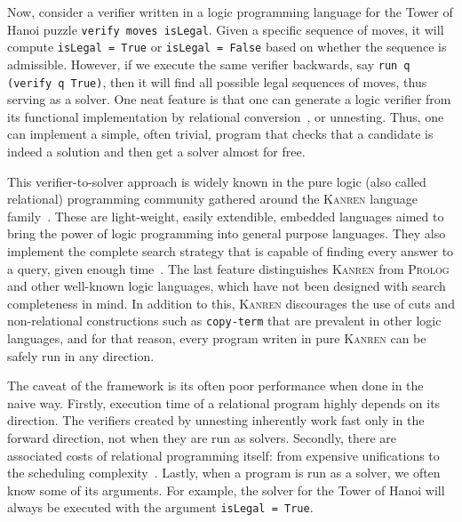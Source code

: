 Now, consider a verifier written in a logic programming language for the Tower of Hanoi puzzle \texttt{verify moves isLegal}. 
Given a specific sequence of moves, it will compute \texttt{isLegal = True} or \texttt{isLegal = False} based on whether the sequence is admissible. 
However, if we execute the same verifier backwards, say \texttt{run q (verify q True)}, then it will find all possible legal sequences of moves, thus serving as a solver. 
One neat feature is that one can generate a logic verifier from its functional implementation by relational conversion~\cite{lozov2018typed}, or unnesting. 
Thus, one can implement a simple, often trivial, program that checks that a candidate is indeed a solution and then get a solver almost for free. 

This verifier-to-solver approach is widely known in the pure logic (also called relational) programming community gathered around the \textsc{Kanren} language family~\cite{TheReasonedSchemer,byrd2017unified}. 
These are light-weight, easily extendible, embedded languages aimed to bring the power of logic programming into general purpose languages. 
They also implement the complete search strategy that is capable of finding every answer to a query, given enough time~\cite{kiselyov2005backtracking}.
The last feature distinguishes \textsc{Kanren} from \textsc{Prolog} and other well-known logic languages, which have not been designed with search completeness in mind. 
In addition to this, \textsc{Kanren} discourages the use of cuts and non-relational constructions such as \texttt{copy-term} that are prevalent in other logic languages, and for that reason, every program writen in pure \textsc{Kanren} can be safely run in any direction. 

The caveat of the framework is its often poor performance when done in the naive way. 
Firstly, execution time  of a relational program highly depends on its direction. 
The verifiers created by unnesting inherently work fast only in the forward direction, not when they are run as solvers. 
Secondly, there are associated costs of relational programming itself: from expensive unifications to the scheduling complexity~\cite{rozplokhas2022scheduling}. 
Lastly, when a program is run as a solver, we often know some of its arguments. 
For example, the solver for the Tower of Hanoi will always be executed with the argument \texttt{isLegal = True}. 

